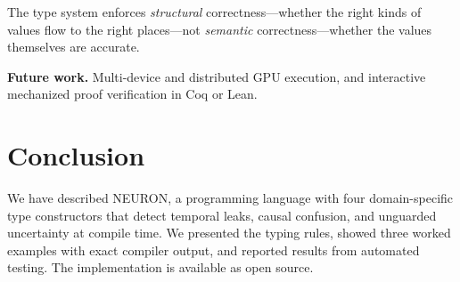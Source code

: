 \documentclass[11pt,a4paper]{article}
\begin{document}
The type system enforces \emph{structural} correctness---whether the right kinds of values flow to the right places---not \emph{semantic} correctness---whether the values themselves are accurate.

\textbf{Future work.} Multi-device and distributed GPU execution, and interactive mechanized proof verification in Coq or Lean.


\section{Conclusion}

We have described NEURON, a programming language with four domain-specific type constructors that detect temporal leaks, causal confusion, and unguarded uncertainty at compile time. We presented the typing rules, showed three worked examples with exact compiler output, and reported results from automated testing. The implementation is available as open source.

\end{document}

